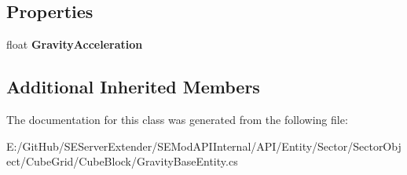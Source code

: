 \subsection*{Properties}
\begin{DoxyCompactItemize}
\item 
\hypertarget{class_s_e_mod_a_p_i_internal_1_1_a_p_i_1_1_entity_1_1_sector_1_1_sector_object_1_1_cube_grid_1_19775a6da854269d8b1b6a1ac0a29f275_a466d7aee144cb78f30a797ba7072874d}{}float {\bfseries Gravity\+Acceleration}\label{class_s_e_mod_a_p_i_internal_1_1_a_p_i_1_1_entity_1_1_sector_1_1_sector_object_1_1_cube_grid_1_19775a6da854269d8b1b6a1ac0a29f275_a466d7aee144cb78f30a797ba7072874d}

\end{DoxyCompactItemize}
\subsection*{Additional Inherited Members}


The documentation for this class was generated from the following file\+:\begin{DoxyCompactItemize}
\item 
E\+:/\+Git\+Hub/\+S\+E\+Server\+Extender/\+S\+E\+Mod\+A\+P\+I\+Internal/\+A\+P\+I/\+Entity/\+Sector/\+Sector\+Object/\+Cube\+Grid/\+Cube\+Block/Gravity\+Base\+Entity.\+cs\end{DoxyCompactItemize}
